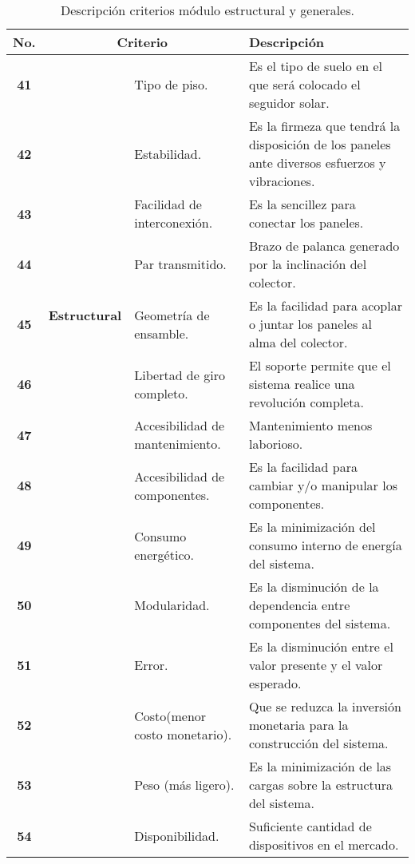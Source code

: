 \begin{table}[H]
	\centering
	\small
	\caption{Descripción criterios módulo estructural y generales.}
	\begin{tabular}{|c|c|p{10em}|p{21em}|}
		\hline
		\multicolumn{1}{|p{1.715em}|}{\textbf{No.}} & \multicolumn{2}{p{8em}|}{\textbf{Criterio}} & \textbf{Descripción} \\
		\hline
		\hline
		\textbf{41} & \multicolumn{1}{c|}{\multirow{9}[50]{*}{\begin{sideways}\textbf{Estructural}\end{sideways}}} & Tipo de piso. & Es el tipo de suelo en el que será colocado el seguidor solar. \\
		\cline{1-1}\cline{3-4}    \textbf{42} &       & Estabilidad. & Es la firmeza que tendrá la disposición de los paneles ante diversos esfuerzos y vibraciones. \\
		\cline{1-1}\cline{3-4}    \textbf{43} &       & Facilidad de interconexión. & Es la sencillez para conectar los paneles. \\
		\cline{1-1}\cline{3-4}    \textbf{44} &       & Par transmitido. &  Brazo de palanca generado por la inclinación del colector. \\
		\cline{1-1}\cline{3-4}    \textbf{45} &       & Geometría de ensamble. & Es la facilidad para acoplar o juntar los paneles al alma del colector. \\
		\cline{1-1}\cline{3-4}    \textbf{46} &       & Libertad de giro completo. & El soporte permite que el sistema realice una revolución completa. \\
		\cline{1-1}\cline{3-4}    \textbf{47} &       & Accesibilidad de mantenimiento. & Mantenimiento menos laborioso. \\
		\cline{1-1}\cline{3-4}    \textbf{48} &       & Accesibilidad de componentes. & Es la facilidad para cambiar y/o manipular los componentes. \\
		\hline
		\textbf{49} & \multicolumn{1}{c|}{\multirow{6}[34]{*}{\begin{sideways}\textbf{Generales}\end{sideways}}} & Consumo energético. & Es la minimización del consumo interno de energía del sistema. \\
		\cline{1-1}\cline{3-4}    \textbf{50} &       & Modularidad. & Es la disminución de la dependencia entre componentes del sistema. \\
		\cline{1-1}\cline{3-4}    \textbf{51} &       & Error. & Es la disminución entre el valor presente y el valor esperado. \\
		\cline{1-1}\cline{3-4}    \textbf{52} &       & Costo(menor costo monetario). & Que se reduzca la inversión monetaria para la construcción del sistema. \\
		\cline{1-1}\cline{3-4}    \textbf{53} &       & Peso (más ligero). & Es la minimización de las cargas sobre la estructura del sistema. \\
		\cline{1-1}\cline{3-4}    \textbf{54} &       & Disponibilidad. & Suficiente cantidad de dispositivos en el mercado. \\
		\hline
	\end{tabular}%
	\label{tab:addlabel}%
\end{table}%

\bigskip
\endinput 